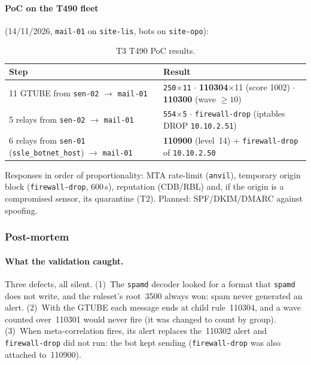 \documentclass[11pt,a4paper]{article}
\begin{document}
\paragraph{PoC on the T490 fleet} (14/11/2026, \texttt{mail-01} on \texttt{site-lis}, bots on \texttt{site-opo}):

\begin{table}[H]
  \centering
  \caption{T3 T490 PoC results.}
  \begin{tabular}{@{}p{5.5cm}p{8.5cm}@{}}
    \toprule
    \textbf{Step} & \textbf{Result} \\
    \midrule
    11 GTUBE from \texttt{sen-02} $\to$ \texttt{mail-01} &
      \texttt{250$\times$11} $\cdot$ \textbf{110304}$\times$11 (score 1002) $\cdot$ \textbf{110300} (wave $\geq 10$) \\
    5 relays from \texttt{sen-02} $\to$ \texttt{mail-01} &
      \texttt{554$\times$5} $\cdot$ \texttt{firewall-drop} (iptables DROP \texttt{10.10.2.51}) \\
    6 relays from \texttt{sen-01} (\texttt{ssle\_botnet\_host}) $\to$ \texttt{mail-01} &
      \textbf{110900} (level~14) + \texttt{firewall-drop} of \texttt{10.10.2.50} \\
    \bottomrule
  \end{tabular}
\end{table}

Responses in order of proportionality: MTA rate-limit (\texttt{anvil}), temporary origin
block (\texttt{firewall-drop}, 600\,s), reputation (CDB/RBL) and, if the origin is a
compromised sensor, its quarantine (T2). Planned: SPF/DKIM/DMARC against spoofing.

\subsubsection{Post-mortem}

\paragraph{What the validation caught.} Three defects, all silent.
(1)~The \texttt{spamd} decoder looked for a format that \texttt{spamd} does not write, and
the ruleset's root~3500 always won: spam never generated an alert.
(2)~With the GTUBE each message ends at child rule~110304, and a wave counted over~110301
would never fire (it was changed to count by group).
(3)~When meta-correlation fires, its alert replaces the~110302 alert and
\texttt{firewall-drop} did not run: the bot kept sending (\texttt{firewall-drop} was also
attached to~110900).
\end{document}
